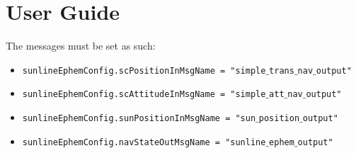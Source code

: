 
\section{User Guide}
The messages must be set as such:

\begin{itemize}
\item    \texttt{sunlineEphemConfig.scPositionInMsgName = "simple$\_$trans$\_$nav$\_$output"}
\item    \texttt{sunlineEphemConfig.scAttitudeInMsgName = "simple$\_$att$\_$nav$\_$output"}
\item    \texttt{sunlineEphemConfig.sunPositionInMsgName = "sun$\_$position$\_$output"}
\item    \texttt{sunlineEphemConfig.navStateOutMsgName = "sunline$\_$ephem$\_$output"}    
\end{itemize}